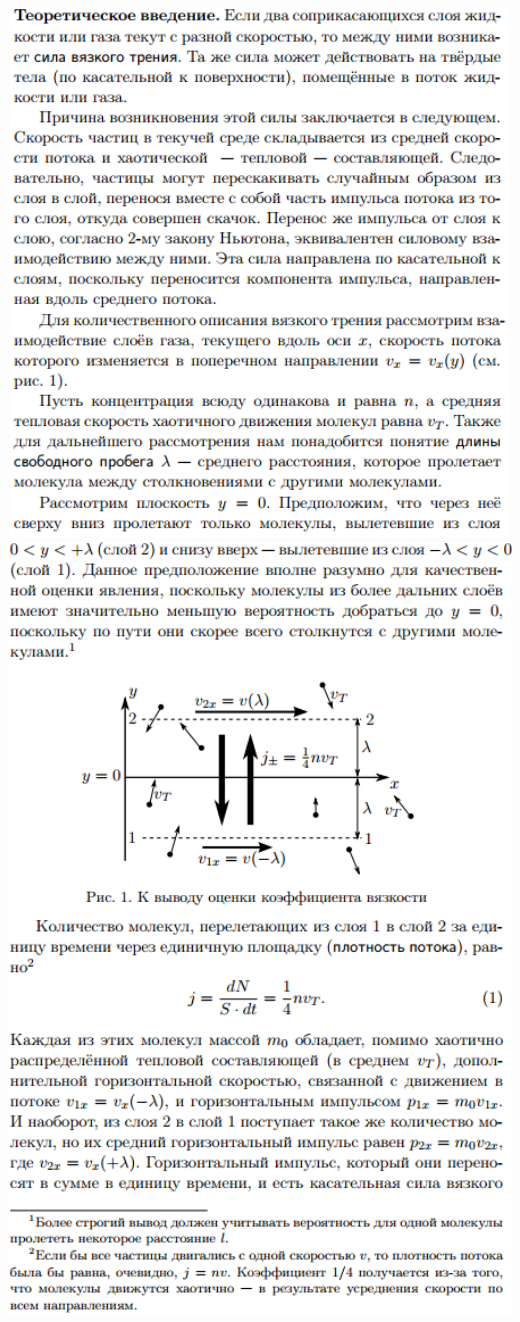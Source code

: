 \documentclass[12pt]{article}
\begin{document}
    \begin{center}
    	\includegraphics[width=16cm, height=14cm]{theory_0.png}
    	\includegraphics[width=16cm]{theory_1.png}

\end{center}
\end{document}
